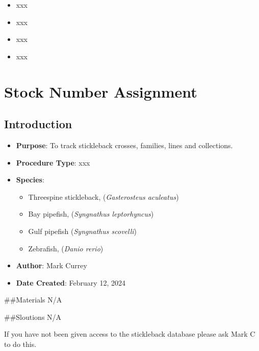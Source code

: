 \documentclass[
  letterpaper,
  DIV=11,
  numbers=noendperiod]{scrreprt}
\providecommand{\tightlist}{%
  \setlength{\itemsep}{0pt}\setlength{\parskip}{0pt}}\usepackage{longtable,booktabs,array}
\begin{document}
\begin{itemize}
\tightlist
\item
  xxx
\item
  xxx
\item
  xxx
\item
  xxx
\end{itemize}

\hypertarget{sec-husbandry-stickleback_database_use}{%
\chapter{Stock Number
Assignment}\label{sec-husbandry-stickleback_database_use}}

\hypertarget{introduction-36}{%
\section{Introduction}\label{introduction-36}}

\begin{itemize}
\tightlist
\item
  \textbf{Purpose}: To track stickleback crosses, families, lines and
  collections.
\item
  \textbf{Procedure Type}: xxx
\item
  \textbf{Species}:

  \begin{itemize}
  \tightlist
  \item
    Threespine stickleback, (\emph{Gasterosteus aculeatus})
  \item
    Bay pipefish, (\emph{Syngnathus leptorhyncus})
  \item
    Gulf pipefish (\emph{Syngnathus scovelli})
  \item
    Zebrafish, (\emph{Danio rerio})
  \end{itemize}
\item
  \textbf{Author}: Mark Currey\\
\item
  \textbf{Date Created}: February 12, 2024
\end{itemize}

\#\#Materials N/A

\#\#Sloutions N/A

\begin{tcolorbox}[enhanced jigsaw, rightrule=.15mm, title=\textcolor{quarto-callout-warning-color}{\faExclamationTriangle}\hspace{0.5em}{NOTE}, titlerule=0mm, opacitybacktitle=0.6, toprule=.15mm, bottomrule=.15mm, opacityback=0, left=2mm, colframe=quarto-callout-warning-color-frame, breakable, coltitle=black, colback=white, colbacktitle=quarto-callout-warning-color!10!white, bottomtitle=1mm, leftrule=.75mm, toptitle=1mm, arc=.35mm]

If you have not been given access to the stickleback database please ask
Mark C to do this.

\end{tcolorbox}
\end{document}
